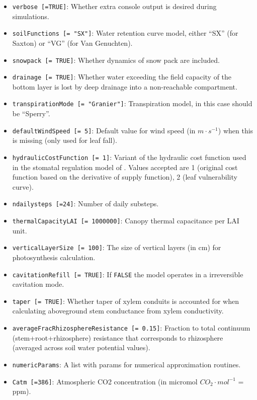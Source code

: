 \documentclass[]{book}
\providecommand{\tightlist}{%
  \setlength{\itemsep}{0pt}\setlength{\parskip}{0pt}}
\begin{document}
\begin{itemize}
\tightlist
\item
  \texttt{verbose\ {[}=TRUE{]}}: Whether extra console output is desired during simulations.
\item
  \texttt{soilFunctions\ {[}=\ "SX"{]}}: Water retention curve model, either ``SX'' (for Saxton) or ``VG'' (for Van Genuchten).
\item
  \texttt{snowpack\ {[}=\ TRUE{]}}: Whether dynamics of snow pack are included.
\item
  \texttt{drainage\ {[}=\ TRUE{]}}: Whether water exceeding the field capacity of the bottom layer is lost by deep drainage into a non-reachable compartment.
\item
  \texttt{transpirationMode\ {[}=\ "Granier"{]}}: Transpiration model, in this case should be ``Sperry''.
\item
  \texttt{defaultWindSpeed\ {[}=\ 5{]}}: Default value for wind speed (in \(m \cdot s^{-1}\)) when this is missing (only used for leaf fall).
\item
  \texttt{hydraulicCostFunction\ {[}=\ 1{]}}: Variant of the hydraulic cost function used in the stomatal regulation model of \citet{Sperry2016}. Values accepted are 1 (original cost function based on the derivative of supply function), 2 (leaf vulnerability curve).
\item
  \texttt{ndailysteps\ {[}=24{]}}: Number of daily substeps.
\item
  \texttt{thermalCapacityLAI\ {[}=\ 1000000{]}}: Canopy thermal capacitance per LAI unit.
\item
  \texttt{verticalLayerSize\ {[}=\ 100{]}}: The size of vertical layers (in cm) for photosynthesis calculation.
\item
  \texttt{cavitationRefill\ {[}=\ TRUE{]}}: If \texttt{FALSE} the model operates in a irreversible cavitation mode.
\item
  \texttt{taper\ {[}=\ TRUE{]}}: Whether taper of xylem conduits is accounted for when calculating aboveground stem conductance from xylem conductivity.
\item
  \texttt{averageFracRhizosphereResistance\ {[}=\ 0.15{]}}: Fraction to total continuum (stem+root+rhizosphere) resistance that corresponds to rhizosphere (averaged across soil water potential values).
\item
  \texttt{numericParams}: A list with params for numerical approximation routines.
\item
  \texttt{Catm\ {[}=386{]}}: Atmospheric CO2 concentration (in micromol \(CO_2 \cdot mol^{-1}\) = ppm).
\end{itemize}
\end{document}
